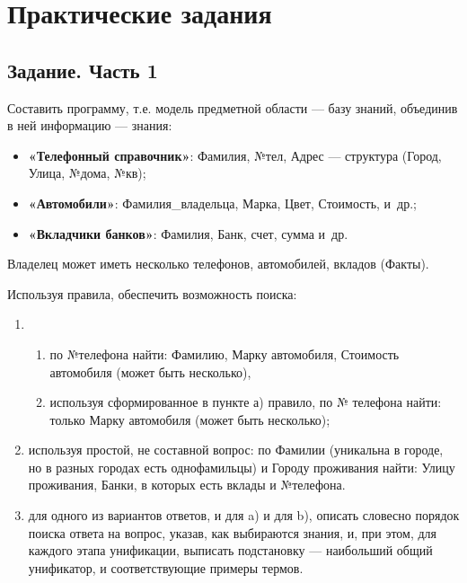 \chapter{Практические задания}

\vspace{-0.5cm}
\section{Задание. Часть 1}
\vspace{-0.5cm}

Составить программу, т.е. модель предметной области --- базу знаний, объединив в
ней информацию --- знания:

\begin{itemize}
    \item \textbf{«Телефонный справочник»}: Фамилия, №тел, Адрес --- структура
        (Город, Улица, №дома, №кв);
    \item \textbf{«Автомобили»}: Фамилия\_владельца, Марка, Цвет, Стоимость,
        и~др.;
    \item \textbf{«Вкладчики банков»}: Фамилия, Банк, счет, сумма и~др.
\end{itemize}

Владелец может иметь несколько телефонов, автомобилей, вкладов \mbox{(Факты)}.

Используя правила, обеспечить возможность поиска:
\begin{enumerate}[label=\arabic*)]
    \item \begin{enumerate}[label=\alph*)]
        \item по №телефона найти: Фамилию, Марку автомобиля, Стоимость
            автомобиля (может быть несколько),
        \item используя сформированное в пункте а) правило, по № телефона найти:
            только Марку автомобиля (может быть несколько);
    \end{enumerate}
    \item используя простой, не составной вопрос: по Фамилии (уникальна в
        городе, но в разных городах есть однофамильцы) и Городу проживания
        найти: Улицу проживания, Банки, в которых есть вклады и №телефона.
    \item для одного из вариантов ответов, и для a) и для b), описать словесно
        порядок поиска ответа на вопрос, указав, как выбираются знания, и, при
        этом, для каждого этапа унификации, выписать подстановку --- наибольший
        общий унификатор, и соответствующие примеры термов.
\end{enumerate}

